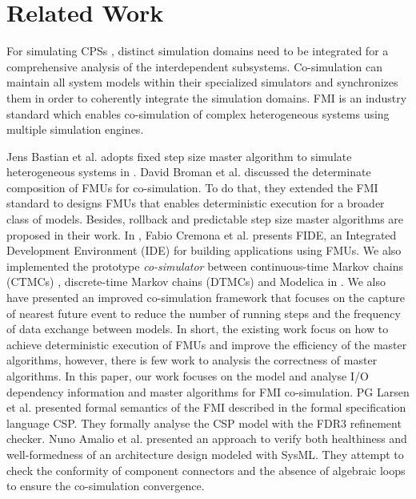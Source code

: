 \section{Related Work}
\label{sec:relateworks}
For simulating CPSs \cite{GeorgMRW14}, distinct
simulation domains need to be integrated for a comprehensive
analysis of the interdependent subsystems. Co-simulation \cite{Bogomolov2015Co} can maintain all system models within their specialized simulators
and synchronizes them in order to coherently integrate the simulation domains. FMI \cite{Blochwitz2011The}\cite{FMI2INTRO} is an industry standard which enables co-simulation of complex heterogeneous systems using multiple simulation engines. 

Jens Bastian et al. adopts fixed step size master algorithm to simulate heterogeneous
systems in \cite{Bastian2011Master}.
David Broman et al. discussed the determinate composition of FMUs for co-simulation. To do that, they extended the FMI standard to designs FMUs that enables deterministic execution for a broader class of models. Besides, rollback and predictable step size master algorithms are proposed in their work. In \cite{CremonaLTBL16}, Fabio Cremona et al. presents FIDE, an Integrated Development Environment
(IDE) for building applications using FMUs. We also implemented the prototype \textit{co-simulator} between continuous-time Markov chains (CTMCs) \cite{DanosHGS17}, discrete-time Markov chains (DTMCs) \cite{Guerry13} and Modelica in \cite{LiuJWCD16}. We also have presented an improved co-simulation framework that focuses on the capture of nearest future event to reduce the number of running steps and the frequency of data exchange between models. 
In short, the existing work focus on how to achieve deterministic execution of FMUs and improve the efficiency of the master algorithms, however, there is few work to analysis the correctness of master algorithms. In this paper, our work focuses on the model and analyse I/O dependency information and master algorithms for FMI co-simulation.
PG Larsen et al. \cite{Larsen2016Integrated} presented formal semantics of the FMI described in the formal specification language CSP. They 
formally analyse the CSP model with the FDR3 refinement checker. Nuno Amalio et al. \cite{AmalioPCW16} presented an approach to verify both healthiness and well-formedness of an architecture design modeled with SysML. They attempt to check the conformity of component connectors and the absence of algebraic loops to ensure the co-simulation convergence.

